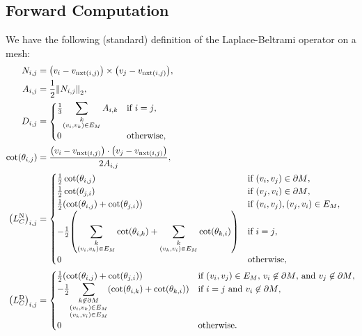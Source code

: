 \subsection{Forward Computation}
We have the following (standard) definition of the Laplace-Beltrami operator on a mesh: \begin{align*}
	N_{i, j} &= \pof{v_i - v_{\nxt\pof{i, j}}} \times \pof{v_j - v_{\nxt\pof{i, j}}}, \\
	A_{i, j} &= \frac{1}{2}\norm{N_{i, j}}_2, \\
	D_{i, j} &= \begin{cases}
		\frac{1}{3}{\displaystyle\sum_{\substack{k \\ \pof{v_i, v_k} \in E_M}}A_{i, k}} & \text{if \(i = j\)}, \\
		0 & \text{otherwise},
	\end{cases} \\
	\cot\pof{\theta_{i, j}} &= \frac{\pof{v_i - v_{\nxt\pof{i, j}}} \cdot \pof{v_j - v_{\nxt\pof{i, j}}}}{2A_{i, j}}, \\
	\pof{L_C^{\text{N}}}_{i, j} &= \begin{cases}
		\frac{1}{2}\cot\pof{\theta_{i, j}} & \text{if \(\pof{v_i, v_j} \in \partial M\)}, \\
		\frac{1}{2}\cot\pof{\theta_{j, i}} & \text{if \(\pof{v_j, v_i} \in \partial M\)}, \\
		\frac{1}{2}\pof{\cot\pof{\theta_{i, j}} + \cot\pof{\theta_{j, i}}} & \text{if \(\pof{v_i, v_j}, \pof{v_j, v_i} \in E_M\)}, \\
		-\frac{1}{2}\pof{\displaystyle\sum_{\substack{k \\ \pof{v_i, v_k} \in E_M}}\cot\pof{\theta_{i, k}} + \sum_{\substack{k \\ \pof{v_k, v_i} \in E_M}}\cot\pof{\theta_{k, i}}} & \text{if \(i = j\)}, \\
		0 & \text{otherwise},
	\end{cases} \\
	\pof{L_C^{\text{D}}}_{i, j} &= \begin{cases}
		\frac{1}{2}\pof{\cot\pof{\theta_{i, j}} + \cot\pof{\theta_{j, i}}} & \text{if \(\pof{v_i, v_j} \in E_M\), \(v_i \not\in \partial M\), and \(v_j \not\in \partial M\)}, \\
		-\frac{1}{2}{\displaystyle\sum_{\substack{k \not\in \partial M \\ \pof{v_i, v_k} \in E_M \\ \pof{v_k, v_i} \in E_M}}\pof{\cot\pof{\theta_{i, k}} + \cot\pof{\theta_{k, i}}}} & \text{if \(i = j\) and \(v_i \not\in \partial M\)}, \\
		0 & \text{otherwise}.
	\end{cases}
\end{align*}

